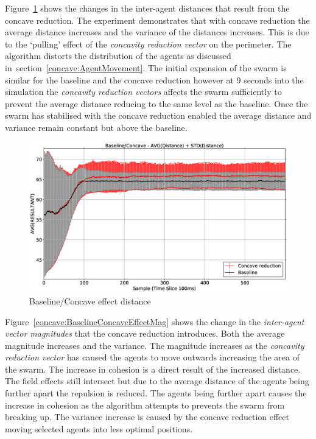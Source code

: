 Figure~\ref{concave:BaselineConcaveEffectDist} shows the changes in the inter-agent distances that result from the concave reduction. The experiment demonstrates that with concave reduction the average distance increases and the variance of the distances increases. This is due to the `pulling' effect of the \textit{concavity reduction vector} on the perimeter. The algorithm distorts the distribution of the agents as discussed in~section~\ref{concave:AgentMovement}. The initial expansion of the swarm is similar for the baseline and the concave reduction however at 9 seconds into the simulation the \textit{concavity reduction vectors} affects the swarm sufficiently to prevent the average distance reducing to the same level as the baseline. Once the swarm has stabilised with the concave reduction enabled the average distance and variance remain constant but above the baseline.

\begin{figure}[H]
\begin{center}
\includegraphics[width=14cm]{CHAPTER-7/figures/BaselineConcaveEffectDist}
\end{center}
\caption{Baseline/Concave effect distance \label{concave:BaselineConcaveEffectDist}}
\end{figure}

Figure~\ref{concave:BaselineConcaveEffectMag} shows the change in the \textit{inter-agent vector magnitudes} that the concave reduction introduces. Both the average magnitude increases and the variance. The magnitude increases as the \textit{concavity reduction vector} has caused the agents to move outwards increasing the area of the swarm. The increase in cohesion is a direct result of the increased distance. The field effects still intersect but due to the average distance of the agents being further apart the repulsion is reduced. The agents being further apart causes the increase in cohesion as the algorithm attempts to prevents the swarm from breaking up. The variance increase is caused by the concave reduction effect moving selected agents into less optimal positions.

